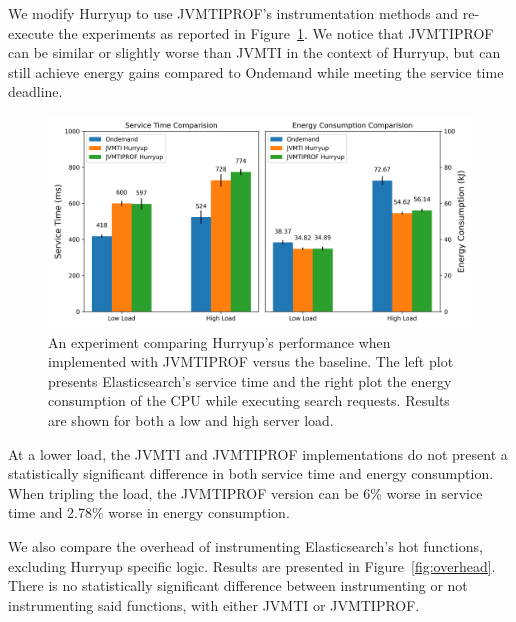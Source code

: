 We modify Hurryup to use JVMTIPROF's instrumentation methods and re-execute the experiments as reported in Figure~\ref{fig:ondem_vs_hup_vs_newhup}. We notice that JVMTIPROF can be similar or slightly worse than JVMTI in the context of Hurryup, but can still achieve energy gains compared to Ondemand while meeting the service time deadline.

\begin{figure}[ht]
\centering
\includegraphics[width=1.0\textwidth]{src/figure/ondem_vs_hup_vs_newhup.png}
\caption{An experiment comparing Hurryup's performance when implemented with JVMTIPROF versus the baseline. The left plot presents Elasticsearch's service time and the right plot the energy consumption of the CPU while executing search requests. Results are shown for both a low and high server load.}
\label{fig:ondem_vs_hup_vs_newhup}
\end{figure}

At a lower load, the JVMTI and JVMTIPROF implementations do not present a statistically significant difference in both service time and energy consumption. When tripling the load, the JVMTIPROF version can be 6\% worse in service time and 2.78\% worse in energy consumption.

We also compare the overhead of instrumenting Elasticsearch's hot functions, excluding Hurryup specific logic. Results are presented in Figure~\ref{fig:overhead}. There is no statistically significant difference between instrumenting or not instrumenting said functions, with either JVMTI or JVMTIPROF.

